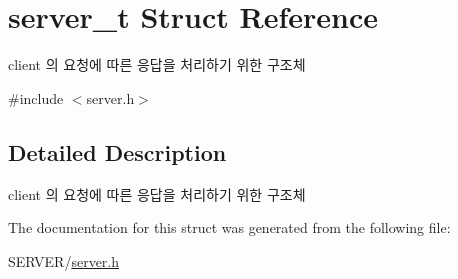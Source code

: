 \hypertarget{structserver__t}{\section{server\-\_\-t Struct Reference}
\label{structserver__t}
}


client 의 요청에 따른 응답을 처리하기 위한 구조체  




{\ttfamily \#include $<$server.\-h$>$}



\subsection{Detailed Description}
client 의 요청에 따른 응답을 처리하기 위한 구조체 

The documentation for this struct was generated from the following file\-:\begin{DoxyCompactItemize}
\item 
S\-E\-R\-V\-E\-R/\hyperlink{server_8h}{server.\-h}\end{DoxyCompactItemize}
